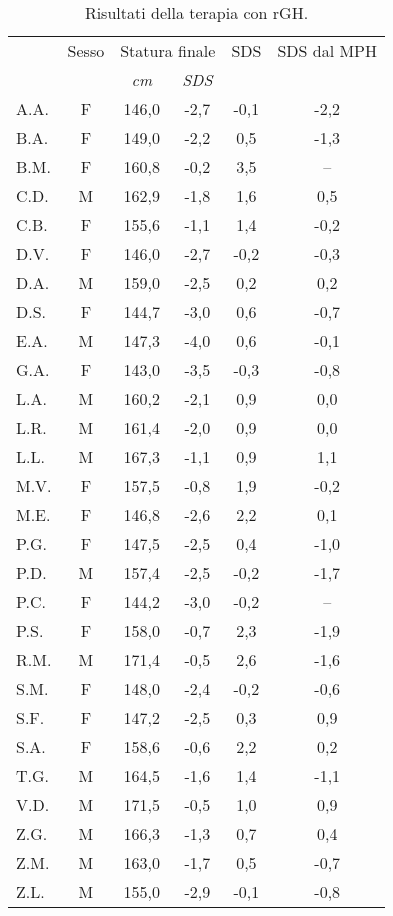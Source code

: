 \begin{table}[!h]
\begin{center}
\begin{tabular}{lccccc}
\toprule
 & Sesso & \multicolumn{2}{c}{Statura finale} 	& \Delta SDS & SDS dal MPH	 \\
\cmidrule(r){3-4}
  &  & \emph{cm} 	& \emph{SDS}  	   	&		& 			 	\\
\midrule
A.A.	& F & 146,0 & -2,7  & -0,1 & -2,2      \\
B.A.	& F & 149,0 & -2,2  & 0,5  & -1,3      \\
B.M.	& F & 160,8 & -0,2  & 3,5  & --        \\
C.D.	& M & 162,9 & -1,8  & 1,6  & 0,5       \\
C.B.	& F & 155,6 & -1,1  & 1,4  & -0,2      \\
D.V.	& F & 146,0 & -2,7  & -0,2 & -0,3      \\
D.A.	& M & 159,0 & -2,5  & 0,2  & 0,2        \\
D.S.	& F & 144,7 & -3,0  & 0,6  & -0,7      \\
E.A.	& M & 147,3 & -4,0  & 0,6  & -0,1      \\
G.A.	& F & 143,0 & -3,5  & -0,3 & -0,8          \\
L.A.	& M & 160,2 & -2,1  & 0,9  & 0,0       \\
L.R.	& M & 161,4 & -2,0  & 0,9  & 0,0       \\
L.L.	& M & 167,3 & -1,1  & 0,9  & 1,1       \\
M.V.	& F & 157,5 & -0,8  & 1,9  & -0,2      \\
M.E.	& F & 146,8 & -2,6  & 2,2  & 0,1       \\
P.G.	& F & 147,5 & -2,5  & 0,4  & -1,0      \\
P.D.	& M & 157,4 & -2,5  & -0,2 & -1,7      \\
P.C.	& F & 144,2 & -3,0  & -0,2 & --       \\
P.S.	& F & 158,0 & -0,7  & 2,3  & -1,9      \\
R.M.	& M & 171,4 & -0,5  & 2,6  & -1,6     \\
S.M.	& F & 148,0 & -2,4  & -0,2 & -0,6      \\
S.F.	& F & 147,2 & -2,5  & 0,3  & 0,9       \\
S.A.	& F & 158,6 & -0,6  & 2,2  & 0,2       \\
T.G.    & M & 164,5 & -1,6  & 1,4  & -1,1     \\
V.D.	& M & 171,5 & -0,5  & 1,0  & 0,9       \\
Z.G.	& M & 166,3 & -1,3  & 0,7  & 0,4     \\
Z.M.	& M & 163,0 & -1,7  & 0,5  & -0,7      \\
Z.L.	& M & 155,0 & -2,9  & -0,1 & -0,8      \\
\bottomrule
\end{tabular}
\end{center}
\caption{Risultati della terapia con rGH.}
\label{tab:Esito}
\end{table}



